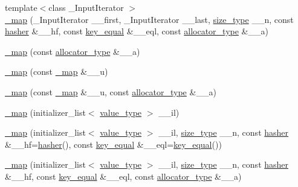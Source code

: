 \begin{DoxyCompactItemize}
\item 
{\footnotesize template$<$class \+\_\+\+Input\+Iterator $>$ }\\\hyperlink{class__map_a04ebc080c66ab88c4bdf5ac4eb2dbc22}{\+\_\+map} (\+\_\+\+Input\+Iterator \+\_\+\+\_\+first, \+\_\+\+Input\+Iterator \+\_\+\+\_\+last, \hyperlink{class__map_adc37f621be25fda072b12873e60e9fc7}{size\+\_\+type} \+\_\+\+\_\+n, const \hyperlink{class__map_a1ca536646126d87b3ac0b7fe3aee3534}{hasher} \&\+\_\+\+\_\+hf, const \hyperlink{class__map_ac341e21272b7041e034855227f1cce49}{key\+\_\+equal} \&\+\_\+\+\_\+eql, const \hyperlink{class__map_ab38dd0bcf1867887afc2be61257ef025}{allocator\+\_\+type} \&\+\_\+\+\_\+a)
\item 
\hyperlink{class__map_a677dc83e78cef73dcecee75eeb89ead9}{\+\_\+map} (const \hyperlink{class__map_ab38dd0bcf1867887afc2be61257ef025}{allocator\+\_\+type} \&\+\_\+\+\_\+a)
\item 
\hyperlink{class__map_a8fff3a3c0a0be24bce0864d165d70698}{\+\_\+map} (const \hyperlink{class__map}{\+\_\+map} \&\+\_\+\+\_\+u)
\item 
\hyperlink{class__map_aaaed55b9af2727834dbab6f0ae52d510}{\+\_\+map} (const \hyperlink{class__map}{\+\_\+map} \&\+\_\+\+\_\+u, const \hyperlink{class__map_ab38dd0bcf1867887afc2be61257ef025}{allocator\+\_\+type} \&\+\_\+\+\_\+a)
\item 
\hyperlink{class__map_a9552b388dde00080c9cd597e5fd3f097}{\+\_\+map} (initializer\+\_\+list$<$ \hyperlink{class__map_a840dcfbf8726d7ecdd0298ffc6afde52}{value\+\_\+type} $>$ \+\_\+\+\_\+il)
\item 
\hyperlink{class__map_a3baa197a3fffee84e9712ef18283bf62}{\+\_\+map} (initializer\+\_\+list$<$ \hyperlink{class__map_a840dcfbf8726d7ecdd0298ffc6afde52}{value\+\_\+type} $>$ \+\_\+\+\_\+il, \hyperlink{class__map_adc37f621be25fda072b12873e60e9fc7}{size\+\_\+type} \+\_\+\+\_\+n, const \hyperlink{class__map_a1ca536646126d87b3ac0b7fe3aee3534}{hasher} \&\+\_\+\+\_\+hf=\hyperlink{class__map_a1ca536646126d87b3ac0b7fe3aee3534}{hasher}(), const \hyperlink{class__map_ac341e21272b7041e034855227f1cce49}{key\+\_\+equal} \&\+\_\+\+\_\+eql=\hyperlink{class__map_ac341e21272b7041e034855227f1cce49}{key\+\_\+equal}())
\item 
\hyperlink{class__map_a33a7a08d7ef36101486858d093f5c1e5}{\+\_\+map} (initializer\+\_\+list$<$ \hyperlink{class__map_a840dcfbf8726d7ecdd0298ffc6afde52}{value\+\_\+type} $>$ \+\_\+\+\_\+il, \hyperlink{class__map_adc37f621be25fda072b12873e60e9fc7}{size\+\_\+type} \+\_\+\+\_\+n, const \hyperlink{class__map_a1ca536646126d87b3ac0b7fe3aee3534}{hasher} \&\+\_\+\+\_\+hf, const \hyperlink{class__map_ac341e21272b7041e034855227f1cce49}{key\+\_\+equal} \&\+\_\+\+\_\+eql, const \hyperlink{class__map_ab38dd0bcf1867887afc2be61257ef025}{allocator\+\_\+type} \&\+\_\+\+\_\+a)

\end{DoxyCompactItemize}
